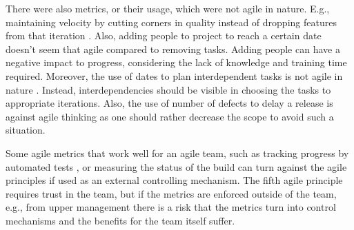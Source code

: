 \documentclass{sig-alternate}
\newcommand{\juha}[1]{\ignorespaces}
\begin{document}
There were also metrics, or their usage, which were not agile in nature. E.g.,
maintaining velocity by cutting corners in quality instead of dropping
features from that iteration \cite{Elssamadisy2002617}. Also, adding people to
project to reach a certain date \cite{Dubinsky200512, Middleton2007387} doesn't seem that
agile compared to removing tasks. Adding people can have a negative impact to
progress, considering the lack of knowledge and training time required.
Moreover, the use of dates to plan interdependent tasks is not agile in
nature \cite{Hong2010310}. Instead, interdependencies should be visible in
choosing the tasks to appropriate iterations. Also, the use of number of
defects to delay a release \cite{Hodgetts2004106} is against agile thinking
as one should rather decrease the scope to avoid such a situation.


Some agile metrics that work well for an agile team, such as tracking progress
by automated tests \cite{Talby200940}, or measuring the status of the build
\cite{Janus20129} can turn against the agile principles if used as an external
controlling mechanism. The fifth agile principle requires trust in the team,
but if the metrics are enforced outside of the team, e.g., from upper
management there is a risk that the metrics turn into control mechanisms and
the benefits for the team itself suffer.

\end{document}
